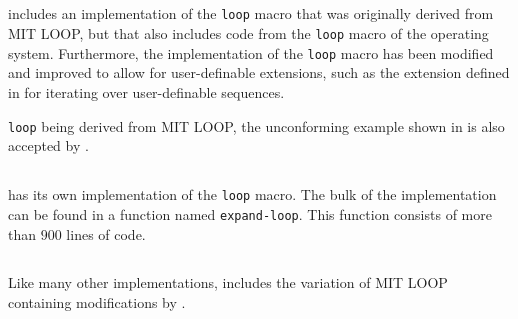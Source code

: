 \subsection{\sbcl{}}

\sbcl{} includes an implementation of the \texttt{loop} macro that was
originally derived from MIT LOOP, but that also includes code from the
\texttt{loop} macro of the \genera{} operating system.  Furthermore,
the \sbcl{} implementation of the \texttt{loop} macro has been
modified and improved to allow for user-definable extensions, such as
the extension defined in \cite{Rhodes:2007:USC:1622123.1622138} for
iterating over user-definable sequences.

\sbcl{} \texttt{loop} being derived from MIT LOOP, the unconforming
example shown in  is also accepted by \sbcl{}.

\subsection{\clisp{}}

\clisp{} has its own implementation of the \texttt{loop} macro.  The
bulk of the implementation can be found in a function named
\texttt{expand-loop}.  This function consists of more than $900$ lines
of code.

\subsection{\ccl{}}

Like many other implementations, \ccl{} includes the variation of MIT
LOOP containing modifications by \symbolics{}.
